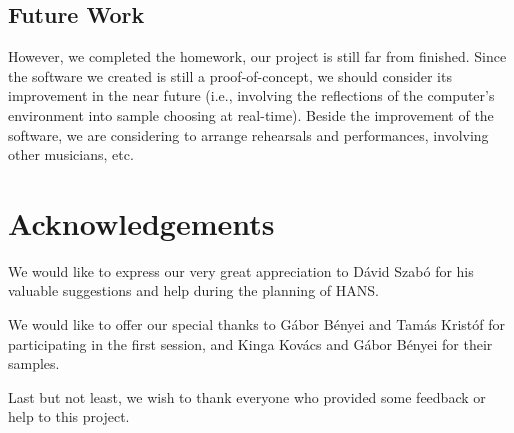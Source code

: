 \documentclass[12pt,a4paper,oneside]{report}
\begin{document}
\subsection*{Future Work}
However, we completed the homework, our project is still far from
finished. Since the software we created is still a proof-of-concept,
we should consider its improvement in the near future (i.e., involving
the reflections of the computer's environment into sample choosing at
real-time). Beside the improvement of the software, we are considering
to arrange rehearsals and performances, involving other musicians,
etc.

\section*{Acknowledgements}
We would like to express our very great appreciation to Dávid Szabó
for his valuable suggestions and help during the planning of HANS.

We would like to offer our special thanks to Gábor Bényei and Tamás
Kristóf for participating in the first session, and Kinga Kovács and
Gábor Bényei for their samples.

Last but not least, we wish to thank everyone who provided some
feedback or help to this project.
\end{document}
